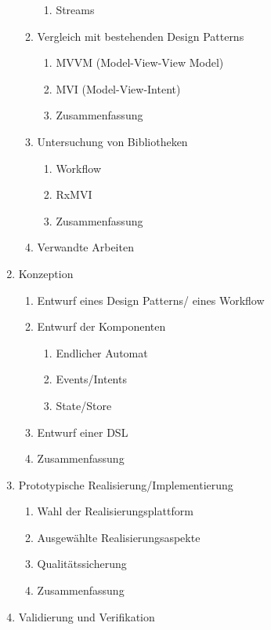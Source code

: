 \begin{enumerate}
\begin{enumerate}
\begin{enumerate}
            \item Streams
        \end{enumerate}
        \item Vergleich mit bestehenden Design Patterns
        \begin{enumerate}
            \item MVVM (Model-View-View Model)
            \item MVI (Model-View-Intent)
            \item Zusammenfassung
        \end{enumerate}
        \item Untersuchung von Bibliotheken
        \begin{enumerate}
            \item Workflow
            \item RxMVI
            \item Zusammenfassung
        \end{enumerate}
        \item Verwandte Arbeiten
    \end{enumerate}
    \item Konzeption
    \begin{enumerate}
        \item Entwurf eines Design Patterns/ eines Workflow
        \item Entwurf der Komponenten
        \begin{enumerate}
            \item Endlicher Automat
            \item Events/Intents
            \item State/Store
        \end{enumerate}
        \item Entwurf einer DSL
        \item Zusammenfassung
    \end{enumerate}
    \item Prototypische Realisierung/Implementierung
        \begin{enumerate}
            \item Wahl der Realisierungsplattform
            \item Ausgewählte Realisierungsaspekte
            \item Qualitätssicherung
            \item Zusammenfassung
        \end{enumerate}
    \item Validierung und Verifikation

\end{enumerate}
